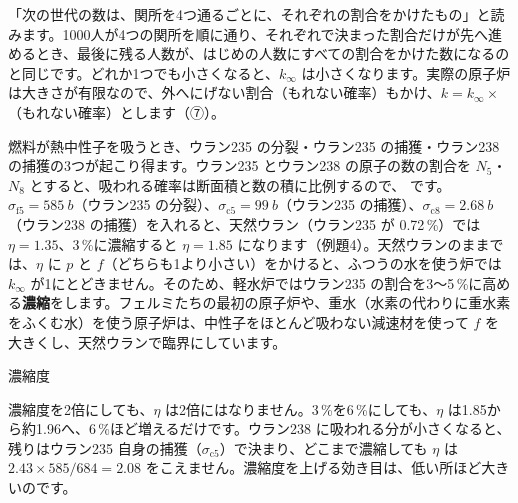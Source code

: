 \begin{phyomi}[$k_\infty=\eta\varepsilon pf$]
「次の世代の数は、関所を4つ通るごとに、それぞれの割合をかけたもの」と読みます。1000人が4つの関所を順に通り、それぞれで決まった割合だけが先へ進めるとき、最後に残る人数が、はじめの人数にすべての割合をかけた数になるのと同じです。どれか1つでも小さくなると、$k_\infty$ は小さくなります。実際の原子炉は大きさが有限なので、外へにげない割合（もれない確率）もかけ、$k=k_\infty\times$（もれない確率）とします（⑦）。
\end{phyomi}

燃料が熱中性子を吸うとき、ウラン235 の分裂・ウラン235 の捕獲・ウラン238 の捕獲の3つが起こり得ます。ウラン235 とウラン238 の原子の数の割合を $N_5$・$N_8$ とすると、吸われる確率は断面積と数の積に比例するので、
です。$\sigma_{\mathrm f5}=\qty{585}{b}$（ウラン235 の分裂）、$\sigma_{\mathrm c5}=\qty{99}{b}$（ウラン235 の捕獲）、$\sigma_{\mathrm c8}=\qty{2.68}{b}$（ウラン238 の捕獲）を入れると、天然ウラン（ウラン235 が 0.72\,\%）では $\eta=1.35$、3\,\%に濃縮すると $\eta=1.85$ になります（例題4）。天然ウランのままでは、$\eta$ に $p$ と $f$（どちらも1より小さい）をかけると、ふつうの水を使う炉では $k_\infty$ が1にとどきません。そのため、軽水炉ではウラン235 の割合を3〜5\,\%に高める\textbf{濃縮}をします。フェルミたちの最初の原子炉や、重水（水素の代わりに重水素をふくむ水）を使う原子炉は、中性子をほとんど吸わない減速材を使って $f$ を大きくし、天然ウランで臨界にしています。

\begin{phbaisuru}{濃縮度}
\noindent\begin{minipage}[c]{0.45\linewidth}\raggedright
濃縮度を2倍にしても、$\eta$ は2倍にはなりません。3\,\%を6\,\%にしても、$\eta$ は1.85から約1.96へ、6\,\%ほど増えるだけです。ウラン238 に吸われる分が小さくなると、残りはウラン235 自身の捕獲（$\sigma_{\mathrm c5}$）で決まり、どこまで濃縮しても $\eta$ は $2.43\times585/684=2.08$ をこえません。濃縮度を上げる効き目は、低い所ほど大きいのです。
\end{minipage}\hfill
\begin{minipage}[c]{0.52\linewidth}\centering
{}
\end{minipage}
\end{phbaisuru}

